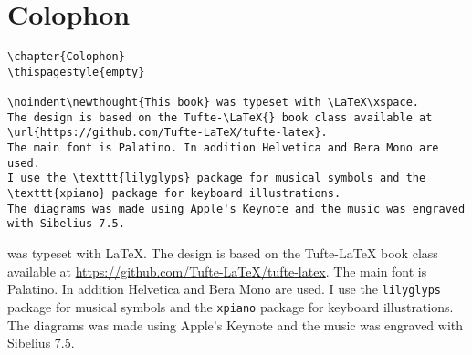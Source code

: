 
\chapter{Colophon}
\thispagestyle{empty}

\begin{fullwidth}

\begin{lstlisting}
\chapter{Colophon}
\thispagestyle{empty}

\noindent\newthought{This book} was typeset with \LaTeX\xspace.
The design is based on the Tufte-\LaTeX{} book class available at \url{https://github.com/Tufte-LaTeX/tufte-latex}.
The main font is Palatino. In addition Helvetica and Bera Mono are used.
I use the \texttt{lilyglyps} package for musical symbols and the \texttt{xpiano} package for keyboard illustrations.
The diagrams was made using Apple's Keynote and the music was engraved with Sibelius 7.5.

\end{lstlisting}

\noindent{} was typeset with \LaTeX\xspace.
The design is based on the Tufte-\LaTeX{} book class available at \url{https://github.com/Tufte-LaTeX/tufte-latex}.
The main font is Palatino. In addition Helvetica and Bera Mono are used.
I use the \texttt{lilyglyps} package for musical symbols and the \texttt{xpiano} package for keyboard illustrations.
The diagrams was made using Apple's Keynote and the music was engraved with Sibelius 7.5.

\end{fullwidth}


